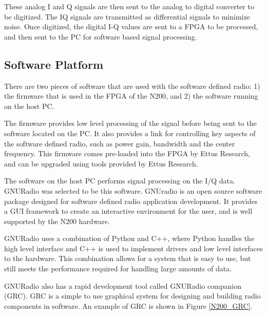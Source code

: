These analog I and Q signals are then sent to the analog to digital converter to be digitized.  The IQ signals are transmitted as differential signals to minimize noise.  Once digitized, the digital I-Q values are sent to a FPGA to be processed, and then sent to the PC for software based signal processing.

\subsection{Software Platform} \label{software_platform}

There are two pieces of software that are used with the software defined radio:  1) the firmware that is used in the FPGA of the N200, and 2) the software running on the host PC.  

The firmware provides low level processing of the signal before being sent to the software located on the PC.  It also provides a link for controlling key aspects of the software defined radio, such as power gain, bandwidth and the center frequency.  This firmware comes pre-loaded into the FPGA by Ettus Research, and can be upgraded using tools provided by Ettus Research.

The software on the host PC performs signal processing on the I/Q data.  GNURadio was selected to be this software.   GNUradio is an open source software package designed for software defined radio application development.  It provides a GUI framework to create an interactive environment for the user, and is well supported by the N200 hardware.  

GNURadio uses a combination of Python and C++, where Python handles the high level interface and C++ is used to implement drivers and low level interfaces to the hardware.  This combination allows for a system that is easy to use, but still meets the performance required for handling large amounts of data. 

GNURadio also has a rapid development tool called GNURadio companion (GRC).  GRC is a simple to use graphical system for designing and building radio components in software. An example of GRC is shown in Figure \ref{N200_GRC}.

